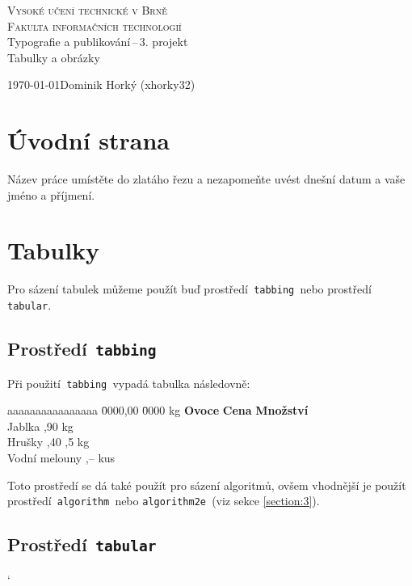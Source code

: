 \documentclass[a4paper, 11pt]{article}
\date{}
\begin{document}
\begin{titlepage}

\begin{center}
\LARGE
\textsc{\Huge Vysoké učení technické v Brně}\\
\textsc{\huge Fakulta informačních technologií}\\
Typografie a publikování\,--\,3. projekt\\[0.4em]
{\Huge Tabulky a obrázky}
\end{center}
{\Large \today \hfill Dominik Horký (xhorky32)}

\end{titlepage}


\section{Úvodní strana}
Název práce umístěte do zlatáho řezu a nezapomeňte uvést dnešní datum a vaše jméno a příjmení.

\section{Tabulky}
Pro sázení tabulek můžeme použít buď prostředí\verb| tabbing |nebo prostředí\verb| tabular|.

\subsection{Prostředí\texttt{ tabbing }}
Při použití\verb| tabbing |vypadá tabulka následovně:
\begin{tabbing}
aaaaaaaaaaaaaaaa \= 0000,00 \= 0000 kg \kill
\textbf{Ovoce} \> \textbf{Cena} \> \textbf{Množství} \\
Jablka ,90  kg \\
Hrušky ,40 ,5 kg \\
Vodní melouny ,--  kus \\
\end{tabbing}
\noindent
Toto prostředí se dá také použít pro sázení algoritmů, ovšem vhodnější je použít 
prostředí\verb| algorithm |nebo \verb|algorithm2e |(viz sekce \ref{section:3}).

\subsection{Prostředí\texttt{ tabular }}
\catcode`
\end{document}
